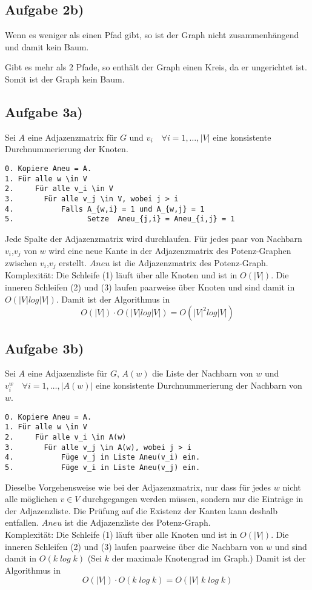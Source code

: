 \documentclass{article}
\begin{document}
\subsection*{Aufgabe 2b)}     
Wenn es weniger als einen Pfad gibt, so ist der Graph nicht zusammenhängend und damit kein Baum.

Gibt es mehr als 2 Pfade, so enthält der Graph einen Kreis, da er ungerichtet ist. Somit ist der Graph kein Baum.


\subsection*{Aufgabe 3a)}  
Sei $A$ eine Adjazenzmatrix für $G$ und $v_i \quad \forall i = 1,\dots,|V|$ eine konsistente Durchnummerierung der Knoten.
 
\begin{verbatim}
0. Kopiere Aneu = A.
1. Für alle w \in V
2.     Für alle v_i \in V
3.       Für alle v_j \in V, wobei j > i
4.           Falls A_{w,i} = 1 und A_{w,j} = 1
5.                 Setze  Aneu_{j,i} = Aneu_{i,j} = 1
\end{verbatim}
Jede Spalte der Adjazenzmatrix wird durchlaufen. Für jedes paar von Nachbarn $v_i$,$v_j$ von $w$ wird eine neue Kante in der Adjazenzmatrix des Potenz-Graphen zwischen $v_i$,$v_j$ erstellt.
$Aneu$ ist die Adjazenzmatrix des Potenz-Graph. \\

Komplexität:
Die Schleife (1) läuft über alle Knoten und ist in $O(|V|)$. Die inneren Schleifen (2) und (3) laufen paarweise über Knoten und sind damit in $O(|V| log |V|)$. Damit ist der Algorithmus in $$O(|V|) \cdot  O(|V| log |V|) =  O(|V|^2 log |V|)$$

\subsection*{Aufgabe 3b)} 
Sei $A$ eine Adjazenzliste für $G$, $A(w)$ die Liste der Nachbarn von $w$ und $v^w_i \quad \forall i = 1,\dots,|A(w)|$ eine konsistente Durchnummerierung der Nachbarn von $w$.

\begin{verbatim}
0. Kopiere Aneu = A.
1. Für alle w \in V
2.     Für alle v_i \in A(w)
3.       Für alle v_j \in A(w), wobei j > i
4.           Füge v_j in Liste Aneu(v_i) ein.
5.           Füge v_i in Liste Aneu(v_j) ein.

\end{verbatim}
Dieselbe Vorgehensweise wie bei der Adjazenzmatrix, nur dass für jedes $w$ nicht alle möglichen $v \in V$ durchgegangen werden müssen, sondern nur die Einträge in der Adjazenzliste. Die Prüfung auf die Existenz der Kanten kann deshalb entfallen. $Aneu$ ist die Adjazenzliste des Potenz-Graph. \\

Komplexität:
Die Schleife (1) läuft über alle Knoten und ist in $O(|V|)$. Die inneren Schleifen (2) und (3) laufen paarweise über die Nachbarn von $w$ und sind damit in $O(k \;log \; k)$ (Sei $k$ der maximale Knotengrad im Graph.) Damit ist der Algorithmus in $$O(|V|) \cdot  O(k \; log\; k) =  O(|V| \; k \; log \; k)$$
\end{document}
